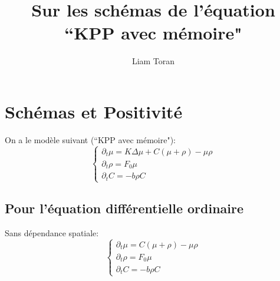\documentclass[11pt]{article}
\title{\textbf{Sur les schémas de l'équation ``KPP avec mémoire"}}
\author{Liam Toran}
\date{}
\newcommand{\dt}{\partial_t}
\begin{document}
\maketitle
\tableofcontents

\section{Schémas et Positivité}
On a le modèle suivant (``KPP avec mémoire"): 
\begin{equation} \left\{
                \begin{array}{ll}
                   \dt\mu = K\Delta\mu + C(\mu + \rho) -\mu\rho\\
                 \dt\rho=  F_0 \mu \\
                  \dt C = -b\rho C
                \end{array}
              \right.
\end{equation}
\subsection{Pour l'équation différentielle ordinaire}
Sans dépendance spatiale:
\begin{equation} \left\{
                \begin{array}{ll}
                   \dt\mu = C(\mu + \rho) -\mu\rho\\
                 \dt\rho=  F_0 \mu \\
                  \dt C = -b\rho C
                \end{array}
              \right.
\end{equation} 
\end{document}
